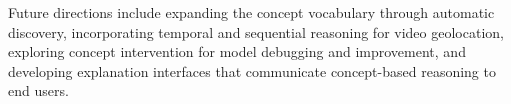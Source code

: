 \documentclass{uva-inf-article}
\begin{document}
Future directions include expanding the concept vocabulary through automatic discovery, incorporating temporal and sequential reasoning for video geolocation, exploring concept intervention for model debugging and improvement, and developing explanation interfaces that communicate concept-based reasoning to end users.


\printbibliography
\end{document}
